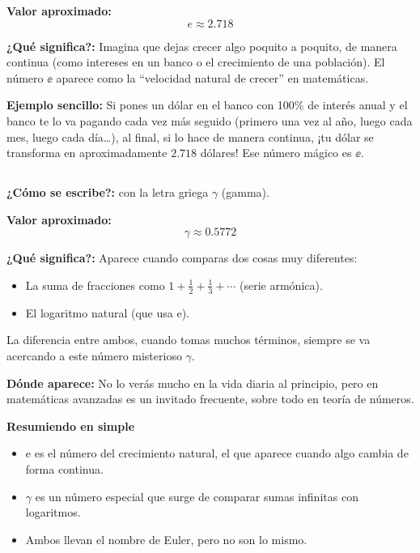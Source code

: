 {\begin{extrabox}
\textbf{Valor aproximado:}
\[
e \approx 2.718
\]

\textbf{¿Qué significa?:}
Imagina que dejas crecer algo poquito a poquito, de manera continua (como intereses en un banco o 
el crecimiento de una población). El número $\ee$ aparece como la “velocidad natural de crecer” en matemáticas.

\textbf{Ejemplo sencillo:}
Si pones un dólar en el banco con 100\% de interés anual y el banco te lo va pagando cada vez más seguido 
(primero una vez al año, luego cada mes, luego cada día\ldots), al final, si lo hace de manera continua, 
¡tu dólar se transforma en aproximadamente $2.718$ dólares! Ese número mágico es $\ee$.

\vspace{2ex}
\subsection*{}

\vspace{0.85ex}
\textbf{¿Cómo se escribe?:} con la letra griega $\gamma$ (gamma).

\textbf{Valor aproximado:} 
\[
\gamma \approx 0.5772
\]

\textbf{¿Qué significa?:}
Aparece cuando comparas dos cosas muy diferentes:
\begin{itemize}
  \item La suma de fracciones como $1 + \tfrac{1}{2} + \tfrac{1}{3} + \cdots$ (serie armónica).
  \item El logaritmo natural (que usa $\mathrm{e}$).
\end{itemize}

La diferencia entre ambos, cuando tomas muchos términos, siempre se va acercando a este número misterioso $\gamma$.

\textbf{Dónde aparece:}
No lo verás mucho en la vida diaria al principio, pero en matemáticas avanzadas es un invitado frecuente, sobre todo en teoría de números.

\begin{center}
{\large\textbf{Resumiendo en simple}}
\end{center}

\begin{itemize}
  \item $\mathrm{e}$ es el número del crecimiento natural, el que aparece cuando algo cambia de forma continua.
  \item $\gamma$ es un número especial que surge de comparar sumas infinitas con logaritmos.
  \item Ambos llevan el nombre de Euler, pero no son lo mismo.
\end{itemize}
\end{extrabox}

}
